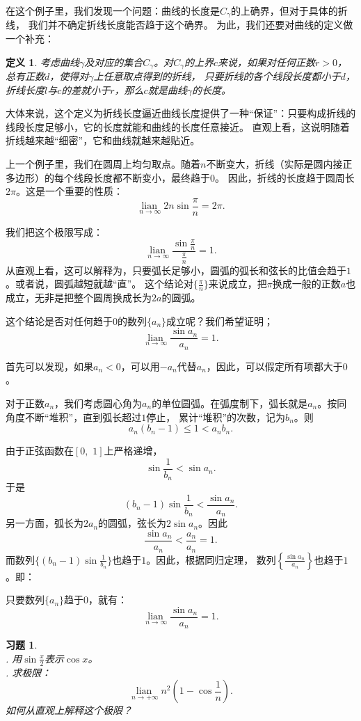 \documentclass[12pt,UTF8]{ctexbook}
\newcommand\lian[1]{
    \underset{#1}{\operatorname{lian}\,}
}
\newtheorem{df}{定义}[section]
\newtheorem{xt}{习题}[section]
\begin{document}
在这个例子里，我们发现一个问题：曲线的长度是$C_\gamma$的上确界，但对于具体的折线，
我们并不确定折线长度能否趋于这个确界。
为此，我们还要对曲线的定义做一个补充：
\begin{df}
    考虑曲线$\gamma$及对应的集合$C_\gamma$。对$C_\gamma$的上界$c$来说，如果对任何正数$r>0$，总有正数$d$，使得对$\gamma$上任意取点得到的折线，
    只要折线的各个线段长度都小于$d$，折线长度$l$与$c$的差就小于$r$，那么$c$就是曲线$\gamma$的长度。
\end{df}

大体来说，这个定义为折线长度逼近曲线长度提供了一种“保证”：只要构成折线的线段长度足够小，它的长度就能和曲线的长度任意接近。
直观上看，这说明随着折线越来越“细密”，它和曲线就越来越贴近。

上一个例子里，我们在圆周上均匀取点。随着$n$不断变大，折线（实际是圆内接正多边形）的每个线段长度都不断变小，最终趋于$0$。
因此，折线的长度趋于圆周长$2\pi$。这是一个重要的性质：
$$ \lian{n\to\infty} 2n\sin{\frac{\pi}{n}} = 2\pi.$$

我们把这个极限写成：
$$ \lian{n\to\infty} \frac{\sin{\frac{\pi}{n}}}{\frac{\pi}{n}} = 1. $$
从直观上看，这可以解释为，只要弧长足够小，圆弧的弧长和弦长的比值会趋于$1$。或者说，圆弧越短就越“直”。
这个结论对$\{\frac{\pi}{n}\}$来说成立，把$\pi$换成一般的正数$a$也成立，无非是把整个圆周换成长为$2a$的圆弧。

这个结论是否对任何趋于$0$的数列$\{a_n\}$成立呢？我们希望证明；
$$ \lian{n\to\infty} \frac{\sin{a_n}}{a_n} = 1. $$

首先可以发现，如果$a_n<0$，可以用$-a_n$代替$a_n$，因此，可以假定所有项都大于$0$。

对于正数$a_n$，我们考虑圆心角为$a_n$的单位圆弧。在弧度制下，弧长就是$a_n$。按同角度不断“堆积”，直到弧长超过$1$停止，
累计“堆积”的次数，记为$b_n$。则
$$ a_n(b_n - 1) \leqslant 1 < a_nb_n. $$

由于正弦函数在$[0,\,\,1]$上严格递增，
$$\sin{\frac{1}{b_n}} < \sin{a_n}. $$
于是
$$ (b_n - 1)\sin{\frac{1}{b_n}} < \frac{\sin{a_n}}{a_n}.$$
另一方面，弧长为$2a_n$的圆弧，弦长为$2\sin{a_n}$。因此
$$\frac{\sin{a_n}}{a_n} < \frac{a_n}{a_n} = 1.$$
而数列$\{(b_n - 1)\sin{\frac{1}{b_n}}\}$也趋于$1$。因此，根据同归定理，
数列$ \left\{\frac{\sin{a_n}}{a_n}\right\}$也趋于$1$。即：

只要数列$\{a_n\}$趋于$0$，就有：
$$ \lian{n\to\infty} \frac{\sin{a_n}}{a_n} = 1. $$

\begin{xt}
    \mbox{} \\
    . 用$\sin{\frac{x}{2}}$表示$\cos{x}$。\\
    . 求极限：
    $$ \lian{n\to +\infty} n^2\left(1 - \cos{\frac{1}{n}}\right).$$
    \indent 如何从直观上解释这个极限？
\end{xt}
\end{document}
